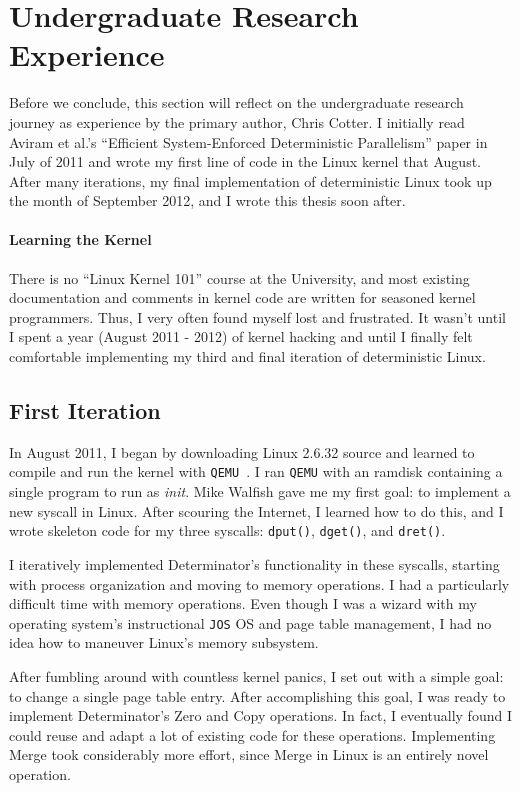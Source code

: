 
\section{Undergraduate Research Experience}
Before we conclude, this section will reflect on the undergraduate research
journey as experience by the primary author, Chris Cotter. I initially read
Aviram et al.'s ``Efficient System-Enforced Deterministic Parallelism'' paper
in July of 2011 and wrote my first line of code in the Linux kernel that August.
After many iterations, my final implementation of deterministic Linux took up
the month of September 2012, and I wrote this thesis soon after.

\paragraph{Learning the Kernel}
There is no ``Linux Kernel 101'' course at the University, and most existing
documentation and comments in kernel code are written for seasoned kernel
programmers. Thus, I very often found myself lost and frustrated. It wasn't
until I spent a year (August 2011 - 2012) of kernel hacking and until I finally
felt comfortable implementing my third and final iteration of deterministic
Linux.

\subsection{First Iteration}
In August 2011, I began by downloading Linux 2.6.32 source and learned to
compile and run the kernel with {\tt QEMU}~\cite{bellard2007qemu}. I ran
{\tt QEMU} with an ramdisk containing a single program to run as \emph{init}.
Mike Walfish gave me my first goal: to implement a new syscall
in Linux. After scouring the Internet, I learned how to do this, and I wrote
skeleton code for my three syscalls: {\tt dput()}, {\tt dget()}, and
{\tt dret()}.

I iteratively implemented Determinator's functionality in these syscalls,
starting with process organization and moving to memory operations. I had a
particularly difficult time with memory operations. Even though I was a wizard
with my operating system's instructional {\tt JOS} OS and page table management,
I had no idea how to maneuver Linux's memory subsystem.

After fumbling around with countless kernel panics, I set out with a simple
goal: to change a single page table entry. After accomplishing this goal,
I was ready to implement Determinator's Zero and Copy operations. In fact, I
eventually found I could reuse and adapt a lot of existing code for these
operations. Implementing Merge took considerably more effort, since Merge in
Linux is an entirely novel operation.

